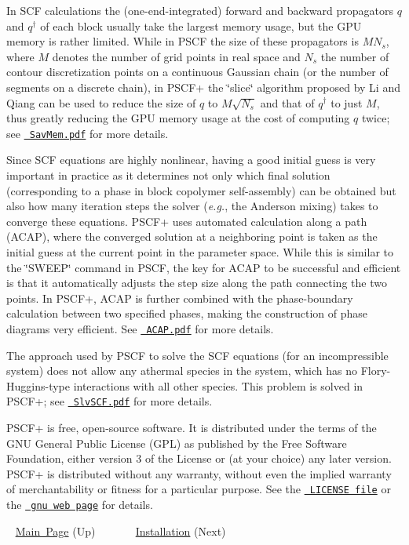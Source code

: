 \begin{DoxyItemize}
\item In S\+CF calculations the (one-\/end-\/integrated) forward and backward propagators $q$ and $q^{\dagger}$ of each block usually take the largest memory usage, but the G\+PU memory is rather limited. While in P\+S\+CF the size of these propagators is $MN_s$, where $M$ denotes the number of grid points in real space and $N_s$ the number of contour discretization points on a continuous Gaussian chain (or the number of segments on a discrete chain), in P\+S\+C\+F+ the \char`\"{}slice\char`\"{} algorithm proposed by Li and Qiang can be used to reduce the size of $q$ to $M\sqrt{N_s}$ and that of $q^{\dagger}$ to just $M$, thus greatly reducing the G\+PU memory usage at the cost of computing $q$ twice; see \href{https://github.com/qwcsu/PSCFplus/blob/master/doc/notes/SavMem.pdf}{\texttt{ Sav\+Mem.\+pdf}} for more details.  
\item Since S\+CF equations are highly nonlinear, having a good initial guess is very important in practice as it determines not only which final solution (corresponding to a phase in block copolymer self-\/assembly) can be obtained but also how many iteration steps the solver ({\itshape e.\+g.}, the Anderson mixing) takes to converge these equations. P\+S\+C\+F+ uses automated calculation along a path (A\+C\+AP), where the converged solution at a neighboring point is taken as the initial guess at the current point in the parameter space. While this is similar to the \char`\"{}\+S\+W\+E\+E\+P\char`\"{} command in P\+S\+CF, the key for A\+C\+AP to be successful and efficient is that it automatically adjusts the step size along the path connecting the two points. In P\+S\+C\+F+, A\+C\+AP is further combined with the phase-\/boundary calculation between two specified phases, making the construction of phase diagrams very efficient. See \href{https://github.com/qwcsu/PSCFplus/blob/master/doc/notes/ACAP.pdf}{\texttt{ A\+C\+A\+P.\+pdf}} for more details.  
\item The approach used by P\+S\+CF to solve the S\+CF equations (for an incompressible system) does not allow any athermal species in the system, which has no Flory-\/\+Huggins-\/type interactions with all other species. This problem is solved in P\+S\+C\+F+; see \href{https://github.com/qwcsu/PSCFplus/blob/master/doc/notes/SlvSCF.pdf}{\texttt{ Slv\+S\+C\+F.\+pdf}} for more details.  
\end{DoxyItemize}

P\+S\+C\+F+ is free, open-\/source software. It is distributed under the terms of the G\+NU General Public License (G\+PL) as published by the Free Software Foundation, either version 3 of the License or (at your choice) any later version. P\+S\+C\+F+ is distributed without any warranty, without even the implied warranty of merchantability or fitness for a particular purpose. See the \href{https://www.gnu.org/licenses/gpl-3.0.html\#license-text}{\texttt{ L\+I\+C\+E\+N\+SE file}} or the \href{https://github.com/qwcsu/PSCFplus/blob/master/LICENSE}{\texttt{ gnu web page}} for details.

~\newline
 \mbox{\hyperlink{index}{Main Page}} (Up) ~ ~ ~ ~ \mbox{\hyperlink{install_page}{Installation}} (Next) 